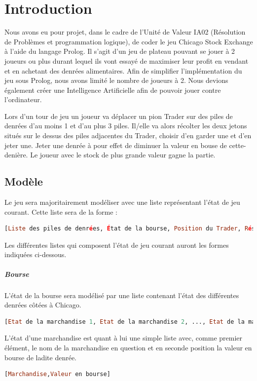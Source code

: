 \documentclass[a4paper, 11pt,twoside, leqno]{report}
\theoremstyle{plain}
\begin{document}
\chapter{Introduction}

Nous avons eu pour projet, dans le cadre de l'Unité de Valeur IA02 (Résolution de Problèmes et programmation logique), de coder le jeu Chicago Stock Exchange à l'aide du langage Prolog. Il s'agit d'un jeu de plateau pouvant se jouer à 2 joueurs ou plus durant lequel ils vont essayé de maximiser leur profit en vendant et en achetant des denrées alimentaires. 
Afin de simplifier l'implémentation du jeu sous Prolog, nous avons limité le nombre de joueurs à 2. Nous devions également créer une Intelligence Artificielle afin de pouvoir jouer contre l'ordinateur. 

Lors d'un tour de jeu un joueur va déplacer un pion Trader sur des piles de denrées d'au moins 1 et d'au plus 3 piles. Il/elle va alors récolter les deux jetons situés sur le dessus des piles adjacentes du Trader, choisir d'en garder une et d'en jeter une. Jeter une denrée à pour effet de diminuer la valeur en bouse de cette-denière. Le joueur avec le stock de plus grande valeur gagne la partie.\\


\section{Modèle}
\noindent Le jeu sera majoritairement modéliser avec une liste représentant l'état de jeu courant. Cette liste sera de la forme : 
\begin{lstlisting}[language=prolog]
[Liste des piles de denrées, État de la bourse, Position du Trader, Réserve du joueur 1, Réserve du joueur 2]
\end{lstlisting}
Les différentes listes qui composent l'état de jeu courant auront les formes indiquées ci-dessous.
\paragraph{Bourse} L'état de la bourse sera modélisé par une liste contenant l'état des différentes denrées côtées à Chicago.
\begin{lstlisting}[language=prolog]
[Etat de la marchandise 1, Etat de la marchandise 2, ..., Etat de la marchandise n]
\end{lstlisting}
L'état d'une marchandise est quant à lui une simple liste avec, comme premier élément, le nom de la marchandise en question et en seconde position la valeur en bourse de ladite denrée.
\begin{lstlisting}[language=prolog]
[Marchandise,Valeur en bourse]
\end{lstlisting}
\end{document}
